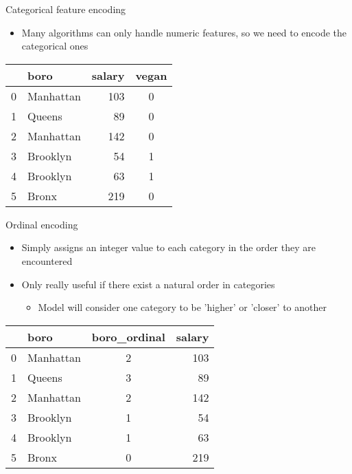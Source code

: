\begin{frame}{Categorical feature encoding}
    \begin{itemize}
        \item Many algorithms can only handle numeric features, so we need to encode the categorical ones
    \end{itemize}

    \vspace{1em}

    \begin{table}
        \centering
        \begin{tabular}{|c|l|r|c|}
            \hline
            & \textbf{boro} & \textbf{salary} & \textbf{vegan} \\
            \hline
            0 & Manhattan & 103 & 0 \\
            1 & Queens    & 89  & 0 \\
            2 & Manhattan & 142 & 0 \\
            3 & Brooklyn  & 54  & 1 \\
            4 & Brooklyn  & 63  & 1 \\
            5 & Bronx     & 219 & 0 \\
            \hline
        \end{tabular}
    \end{table}
\end{frame}



\begin{frame}{Ordinal encoding}
    \begin{itemize}
        \item Simply assigns an integer value to each category in the order they are encountered
        \item Only really useful if there exist a natural order in categories
        \begin{itemize}
            \item Model will consider one category to be 'higher' or 'closer' to another
        \end{itemize}
    \end{itemize}

    \vspace{1em}

    \begin{table}
        \centering
        \begin{tabular}{|c|l|c|r|}
            \hline
            & \textbf{boro} & \textbf{boro\_ordinal} & \textbf{salary} \\
            \hline
            0 & Manhattan & 2 & 103 \\
            1 & Queens    & 3 & 89  \\
            2 & Manhattan & 2 & 142 \\
            3 & Brooklyn  & 1 & 54  \\
            4 & Brooklyn  & 1 & 63  \\
            5 & Bronx     & 0 & 219 \\
            \hline
        \end{tabular}
    \end{table}
\end{frame}


